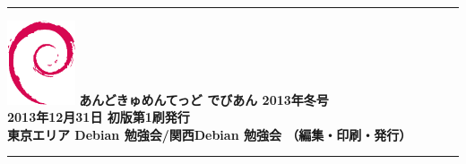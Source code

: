 \documentclass[mingoth,a4paper]{jsarticle}
\begin{document}
\vspace*{13cm}
{\color{dancerlightblue}\rule{\hsize}{1mm}}
\vspace{2mm}
\includegraphics[width=2cm]{image200502/openlogo-nd.eps}
\noindent \Large \bf あんどきゅめんてっど でびあん 2013年冬号\\
\noindent \normalfont 2013年12月31日 \hspace{5mm}  初版第1刷発行\\
\noindent \normalfont 東京エリア Debian 勉強会/関西Debian 勉強会 （編集・印刷・発行）\\
{\color{dancerdarkblue}\rule{\hsize}{1mm}}
\end{document}
